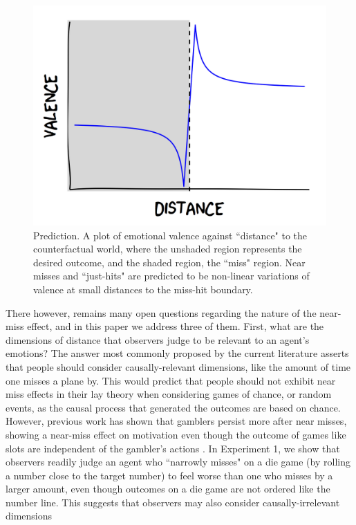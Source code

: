 \documentclass[10pt,letterpaper]{article}
\begin{document}
\begin{figure}[htb!]
\includegraphics[width=\columnwidth]{images/predictionFig.png}
\caption{ Prediction. A plot of emotional valence against ``distance" to the counterfactual world, where the unshaded region represents the desired outcome, and the shaded region, the ``miss" region. Near misses and ``just-hits" are predicted to be non-linear variations of valence at small distances to the miss-hit boundary.}
\label{PredictionFig}
\end{figure}




	There however, remains many open questions regarding the nature of the near-miss effect, and in this paper we address three of them. First, what are the dimensions of distance that observers judge to be relevant to an agent's emotions?  The answer most commonly proposed by the current literature asserts that people should consider causally-relevant dimensions, like the amount of time one misses a plane by. This would predict that people should not exhibit near miss effects in their lay theory when considering games of chance, or random events, as the causal process that generated the outcomes are based on chance. However, previous work has shown that gamblers persist more after near misses, showing a near-miss effect on motivation even though the outcome of games like slots are independent of the gambler's actions \cite{Kassinove2001, Reid1986}. In Experiment 1, we show that observers readily judge an agent who ``narrowly misses" on a die game (by rolling a number close to the target number) to feel worse than one who misses by a larger amount, even though outcomes on a die game are not ordered like the number line. This suggests that observers may also consider causally-irrelevant dimensions
\end{document}
